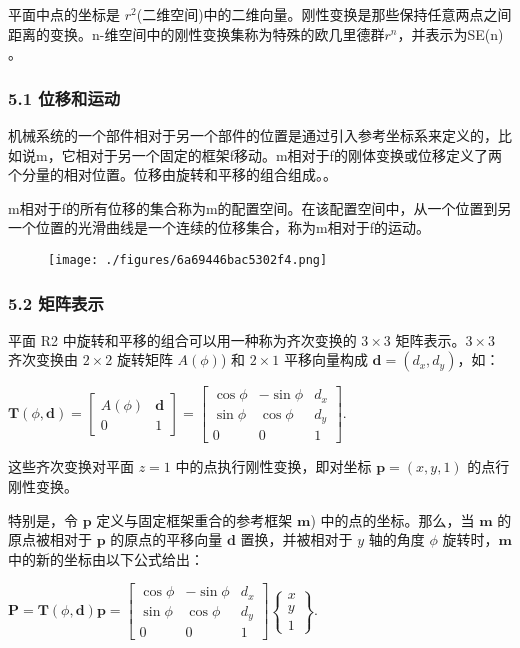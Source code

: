 平面中点的坐标是 $r^2$(二维空间)中的二维向量。刚性变换是那些保持任意两点之间距离的变换。n-维空间中的刚性变换集称为特殊的欧几里德群$r^n$，并表示为SE(n) 。

\subsubsection{5.1 位移和运动}

机械系统的一个部件相对于另一个部件的位置是通过引入参考坐标系来定义的，比如说m，它相对于另一个固定的框架f移动。m相对于f的刚体变换或位移定义了两个分量的相对位置。位移由旋转和平移的组合组成。。

m相对于f的所有位移的集合称为m的配置空间。在该配置空间中，从一个位置到另一个位置的光滑曲线是一个连续的位移集合，称为m相对于f的运动。

\begin{figure}[ht]
\centering
\texttt{[image: ./figures/6a69446bac5302f4.png]}
\caption \label{fig_YDX_2}
\end{figure}

\subsubsection{5.2 矩阵表示}

平面 R2 中旋转和平移的组合可以用一种称为齐次变换的 $3 \times 3 $ 矩阵表示。$ 3 \times 3 $ 齐次变换由 $ 2 \times 2 $ 旋转矩阵 $ A(\phi) $) 和 $2 \times 1 $ 平移向量构成 $\mathbf{d} = (d_x, d_y)$，如：

$\mathbf{T}(\phi, \mathbf{d}) = \begin{bmatrix}A(\phi) & \mathbf{d} \\0 & 1 \end{bmatrix} = \begin{bmatrix}\cos \phi & -\sin \phi & d_x \\\sin \phi & \cos \phi & d_y \\0 & 0 & 1\end{bmatrix}$.

这些齐次变换对平面 $ z=1 $ 中的点执行刚性变换，即对坐标 $\mathbf{p} = (x, y, 1) $ 的点行刚性变换。

特别是，令 $\mathbf{p}$ 定义与固定框架重合的参考框架 $\mathbf{m}$) 中的点的坐标。那么，当 $\mathbf{m}$ 的原点被相对于 $\mathbf{p}$ 的原点的平移向量 $\mathbf{d} $ 置换，并被相对于 $ y $ 轴的角度 $\phi$ 旋转时，$\mathbf{m}$ 中的新的坐标由以下公式给出：

$\mathbf{P} = \mathbf{T}(\phi, \mathbf{d}) \mathbf{p} = \begin{bmatrix}\cos \phi & -\sin \phi & d_x \\\sin \phi & \cos \phi & d_y \\0 & 0 & 1\end{bmatrix}\begin{Bmatrix}x \\ y \\1\end{Bmatrix}$.

